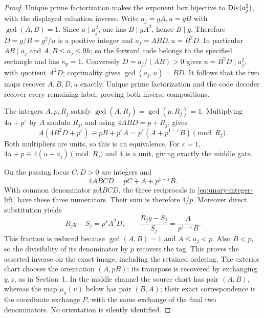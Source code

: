 \begin{proof}
Unique prime factorization makes the exponent box bijective to
\(\operatorname{Div}(a_j^2)\), with the displayed valuation inverse.
Write \(a_j=gA,u=gB\) with \(\gcd(A,B)=1\).
Since \(u\mid a_j^2\), one has \(B\mid gA^2\), hence
\(B\mid g\).  Therefore \(D=g/B=g^2/u\) is a positive
integer and \(a_j=ABD,u=B^2D\).
In particular \(AB\mid a_j\) and \(A,B\le a_j\le9h\);
so the forward code belongs to the specified rectangle
and has \(\kappa_p=1\).
Conversely \(D=a_j/(AB)>0\) gives
\(u=B^2D\mid a_j^2\), with quotient \(A^2D\);
coprimality gives \(\gcd(a_j,u)=BD\).
It follows that the two maps recover \(A,B,D,u\) exactly.
Unique prime factorization and the code decoder recover every
remaining label, proving both inverse compositions.

The integers \(A,p,R_j\) satisfy
\(\gcd(A,R_j)=\gcd(p,R_j)=1\).
Multiplying \(4u+p^\varepsilon\) by \(A\) modulo \(R_j\),
and using \(4ABD=p+R_j\), gives
\[
 A(4B^2D+p^\varepsilon)
       \equiv pB+p^\varepsilon A
       =p^\varepsilon(A+p^{1-\varepsilon}B)\pmod{R_j}.
\]
Both multipliers are units, so this is an equivalence.
For \(\varepsilon=1\), \(4u+p\equiv4(u+a_j)\pmod{R_j}\)
and \(4\) is a unit, giving exactly the middle gate.

On the passing locus \(C,D>0\) are integers and
\[
 4ABCD=pC+A+p^{1-\varepsilon}B.
\]
With common denominator \(pABCD\), the three reciprocals
in \eqref{eq:unary-integer-lift} have these three
numerators.  Their sum is therefore \(4/p\).
Moreover direct substitution yields
\[
 R_jy-S_j=p^\varepsilon A^2D,\qquad
 \frac{R_jy-S_j}{S_j}=\frac{A}{p^{1-\varepsilon}B}.
\]
This fraction is reduced because \(\gcd(A,B)=1\) and
\(A\le a_j<p\).  Also \(B<p\), so the divisibility
of its denominator by \(p\) recovers the tag.
This proves the asserted inverse on the exact image,
including the retained ordering.  The exterior chart chooses
the orientation \((A,pB)\); its transpose is recovered by
exchanging \(y,z\), as in Section~1.
In the middle channel the source chart has pair \((A,B)\),
whereas the map \(\mu_a(u)\) below has pair \((B,A)\);
their exact correspondence is the coordinate exchange \(P\),
with the same exchange of the final two denominators.
No orientation is silently identified.
\end{proof}

